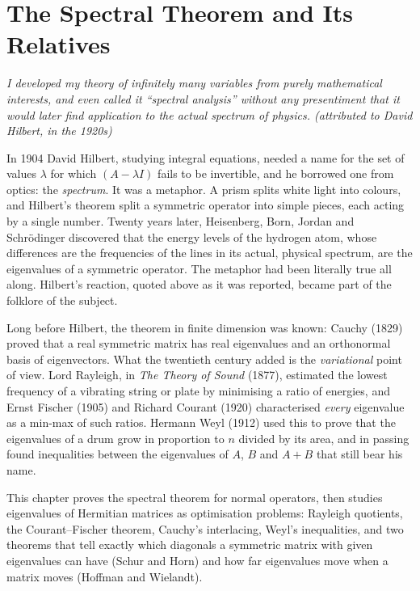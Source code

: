 \chapter{The Spectral Theorem and Its Relatives}\label{ch:spectral}

\begin{center}\itshape
I developed my theory of infinitely many variables from purely mathematical interests, and even called it ``spectral
analysis'' without any presentiment that it would later find application to the actual spectrum of physics.
\upshape(attributed to David Hilbert, in the 1920s)
\end{center}

In 1904 David Hilbert, studying integral equations, needed a name for the set of values $\lambda$ for which $(A-\lambda I)$
fails to be invertible, and he borrowed one from optics: the \emph{spectrum}. It was a metaphor. A prism splits white light
into colours, and Hilbert's theorem split a symmetric operator into simple pieces, each acting by a single number. Twenty
years later, Heisenberg, Born, Jordan and Schr\"odinger discovered that the energy levels of the hydrogen atom, whose
differences are the frequencies of the lines in its actual, physical spectrum, are the eigenvalues of a symmetric
operator. The metaphor had been literally true all along. Hilbert's reaction, quoted above as it was reported, became part
of the folklore of the subject.

Long before Hilbert, the theorem in finite dimension was known: Cauchy (1829) proved that a real symmetric matrix has real
eigenvalues and an orthonormal basis of eigenvectors. What the twentieth century added is the \emph{variational} point of
view. Lord Rayleigh, in \emph{The Theory of Sound} (1877), estimated the lowest frequency of a vibrating string or plate by
minimising a ratio of energies, and Ernst Fischer (1905) and Richard Courant (1920) characterised \emph{every} eigenvalue
as a min-max of such ratios. Hermann Weyl (1912) used this to prove that the eigenvalues of a drum grow in proportion to $n$
divided by its area, and in passing found inequalities between the eigenvalues of $A$, $B$ and $A+B$ that still bear his
name.

This chapter proves the spectral theorem for normal operators, then studies eigenvalues of Hermitian matrices as
optimisation problems: Rayleigh quotients, the Courant--Fischer theorem, Cauchy's interlacing, Weyl's inequalities, and two
theorems that tell exactly which diagonals a symmetric matrix with given eigenvalues can have (Schur and Horn) and how far
eigenvalues move when a matrix moves (Hoffman and Wielandt).

